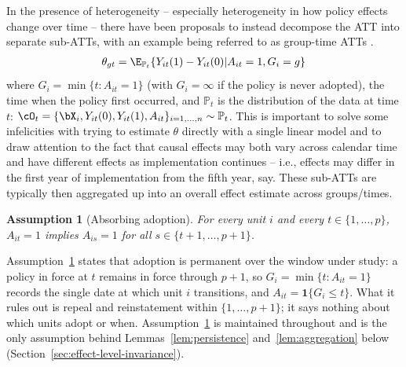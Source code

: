 \documentclass{article}
\newtheorem{assumption}{Assumption}
\renewcommand{\P}{\mathbb{P}}
\begin{document}
In the presence of heterogeneity -- especially heterogeneity in how policy effects change over time -- there have been proposals to instead decompose the ATT into separate sub-ATTs, with an example being referred to as group-time ATTs \citep{sunEstimatingDynamicTreatment2021}.
\begin{align*}
    \theta_{gt} = \E_{\P_t}\{Y_{it}(1) - Y_{it}(0) | A_{it} = 1, G_{i} = g\}
\end{align*}
where $G_i = \min\{t : A_{it} = 1\}$ (with $G_i = \infty$ if the policy is never adopted), the time when the policy first occurred, and $\P_t$ is the distribution of the data at time $t$: $\cO_t = \{\bX_i, Y_{it}(0), Y_{it}(1), A_{it}\}_{i = 1, ..., n} \sim \P_t$. This is important to solve some infelicities with trying to estimate $\theta$ directly with a single linear model \citep{sunEstimatingDynamicTreatment2021} and to draw attention to the fact that causal effects may both vary across calendar time and have different effects as implementation continues -- i.e., effects may differ in the first year of implementation from the fifth year, say. These sub-ATTs are typically then aggregated up into an overall effect estimate across groups/times.

\begin{assumption}[Absorbing adoption]\label{absorbing-adoption}
For every unit $i$ and every $t \in \{1,\ldots,p\}$, $A_{it} = 1$ implies $A_{is} = 1$ for all $s \in \{t+1,\ldots,p+1\}$.
\end{assumption}

Assumption~\ref{absorbing-adoption} states that adoption is permanent over the window under study: a policy in force at $t$ remains in force through $p+1$, so $G_i = \min\{t : A_{it}=1\}$ records the single date at which unit $i$ transitions, and $A_{it} = \mathbf{1}\{G_i \leq t\}$. What it rules out is repeal and reinstatement within $\{1,\ldots,p+1\}$; it says nothing about which units adopt or when. Assumption~\ref{absorbing-adoption} is maintained throughout and is the only assumption behind Lemmas~\ref{lem:persistence} and~\ref{lem:aggregation} below (Section~\ref{sec:effect-level-invariance}).
\end{document}
